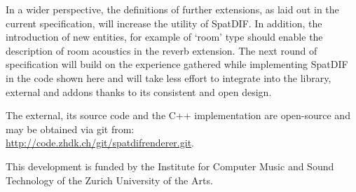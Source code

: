 \documentclass{article}
\begin{document}

In a wider perspective, the definitions of further extensions, as laid out in the current specification, will increase the utility of SpatDIF.
In addition, the introduction of new entities, for example of `room' type should enable the description of room acoustics in the reverb extension.
The next round of specification will build on the experience gathered while implementing SpatDIF in the code shown here and will take less effort to integrate into the library, external and addons thanks to its consistent and open design.

The external, its source code and the C++ implementation are open-source and may be obtained via git from:\\ \footnotesize\url{http://code.zhdk.ch/git/spatdifrenderer.git}.\normalsize


\begin{acknowledgments}
This development is funded by the Institute for Computer Music and Sound Technology of the Zurich University of the Arts.
\end{acknowledgments} 

\printbibliography
\end{document}
